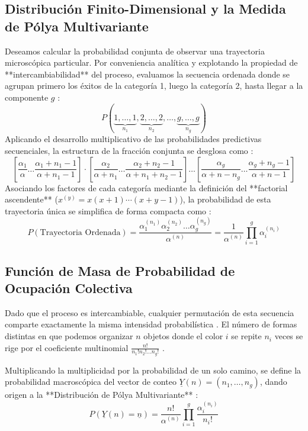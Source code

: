 \subsection{Distribución Finito-Dimensional y la Medida de Pólya Multivariante}

Deseamos calcular la probabilidad conjunta de observar una trayectoria microscópica particular. Por conveniencia analítica y explotando la propiedad de **intercambiabilidad** del proceso, evaluamos la secuencia ordenada donde se agrupan primero los éxitos de la categoría 1, luego la categoría 2, hasta llegar a la componente $g$ :
\begin{equation*}
    P(\underbrace{1, \dots, 1}_{n_1}, \underbrace{2, \dots, 2}_{n_2}, \dots, \underbrace{g, \dots, g}_{n_g}) 
\end{equation*}
Aplicando el desarrollo multiplicativo de las probabilidades predictivas secuenciales, la estructura de la fracción conjunta se desglosa como :
\begin{equation*}
    \left[ \frac{\alpha_1}{\alpha} \dots \frac{\alpha_1+n_1-1}{\alpha+n_1-1} \right] \cdot \left[ \frac{\alpha_2}{\alpha+n_1} \dots \frac{\alpha_2+n_2-1}{\alpha+n_1+n_2-1} \right] \dots \left[ \frac{\alpha_g}{\alpha+n-n_g} \dots \frac{\alpha_g+n_g-1}{\alpha+n-1} \right] 
\end{equation*}
Asociando los factores de cada categoría mediante la definición del **factorial ascendente** ($x^{(y)} = x(x+1)\cdots(x+y-1)$), la probabilidad de esta trayectoria única se simplifica de forma compacta como :
\begin{equation*}
    P(\text{Trayectoria Ordenada}) = \frac{\alpha_1^{(n_1)} \alpha_2^{(n_2)} \dots \alpha_g^{(n_g)}}{\alpha^{(n)}} = \frac{1}{\alpha^{(n)}} \prod_{i=1}^{g} \alpha_i^{(n_i)} 
\end{equation*}

\subsection*{Función de Masa de Probabilidad de Ocupación Colectiva}
Dado que el proceso es intercambiable, cualquier permutación de esta secuencia comparte exactamente la misma intensidad probabilística . El número de formas distintas en que podemos organizar $n$ objetos donde el color $i$ se repite $n_i$ veces se rige por el coeficiente multinomial $\frac{n!}{n_1! n_2! \dots n_g!}$ .

Multiplicando la multiplicidad por la probabilidad de un solo camino, se define la probabilidad macroscópica del vector de conteo $\underline{Y}(n) = (n_1, \dots, n_g)$, dando origen a la **Distribución de Pólya Multivariante** :
\begin{equation*}
    P(\underline{Y}(n) = \underline{n}) = \frac{n!}{\alpha^{(n)}} \prod_{i=1}^{g} \frac{\alpha_i^{(n_i)}}{n_i!} 
\end{equation*}


